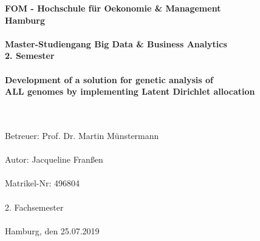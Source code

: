 		\begin{titlepage}
			\begin{center}
			\setlength{\headheight}{1.5\baselineskip}
			\renewcommand{\baselinestretch}{1.5}
					\textbf{\large FOM - Hochschule für Oekonomie \& Management \\
						Hamburg \\
						\ \\
						Master-Studiengang Big Data \& Business Analytics \\
						2. Semester \\
						\ \\
						Development of a solution for genetic analysis of \\
						ALL genomes by implementing Latent Dirichlet allocation\\ 
						\ \\
						}
						
					\textrm{
						\ \\
						Betreuer: Prof. Dr. Martin Münstermann \\
						\ \\
						Autor: Jacqueline Franßen \\
						\ \\
						Matrikel-Nr: 496804 \\
						\ \\
						2. Fachsemester \\
						\ \\
						Hamburg, den 25.07.2019 \\
						}
			\end{center}
		\end{titlepage}

%

			\setcounter{tocdepth}{3}
			\setcounter{secnumdepth}{3}		
			\thispagestyle{empty}
			\tableofcontents
			\newpage
			\listoffigures
			\listoftables
			\printglossary[type=acronym,style=listdotted,title=Abkürzungsverzeichnis,toctitle=Abkürzungsverzeichnis] 
			\newpage
			\thispagestyle{empty}